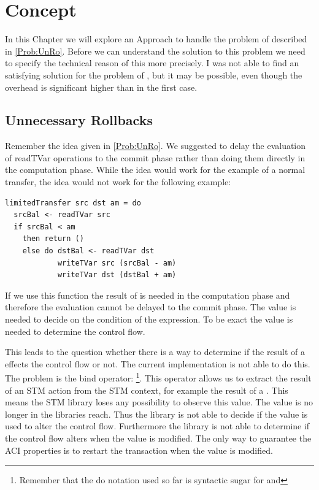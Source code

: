 
\chapter{Concept} %

\label{Chapter2} %

In this Chapter we will explore an Approach to handle the problem of  described in \ref{Prob:UnRo}.
Before we can understand the solution to this problem we need to specify the technical reason of this more precisely. 
I was not able to find an satisfying solution for the problem of , but it may 
be possible, even though the overhead is significant higher than in the first case.

\section{Unnecessary Rollbacks}
Remember the idea given in \ref{Prob:UnRo}. We suggested to delay the evaluation of 
readTVar operations to the commit phase rather than doing them directly in the computation
phase. While the idea would work for the example of a normal transfer, the idea would not work 
for the following example:
\begin{lstlisting}
limitedTransfer src dst am = do 
  srcBal <- readTVar src
  if srcBal < am
    then return ()
    else do dstBal <- readTVar dst
            writeTVar src (srcBal - am)
            writeTVar dst (dstBal + am)
\end{lstlisting}
If we use this function the result of  is needed in the computation phase and therefore 
the evaluation cannot be delayed to the commit phase. The value is needed to decide on the condition of the 
 expression. To be exact the value is needed to determine the control flow. 

This leads to the question whether there is a way to determine if the result of a  effects the 
control flow or not. The current implementation is not able to do this. The problem is the bind
operator: \footnote{Remember that the do notation used so far is 
syntactic sugar for \code{>>=} and \code{>>}}. This operator allows us to extract the result of an STM action 
from the STM context, for example the result of a . This means the STM library loses any possibility to 
observe this value. The value is no longer in the libraries reach. Thus the library is not able to decide if 
the value is used to alter the control flow. Furthermore the library is not able to determine if the control
flow alters when the value is modified. The only way to guarantee the ACI properties is to restart the 
transaction when the value is modified. 

